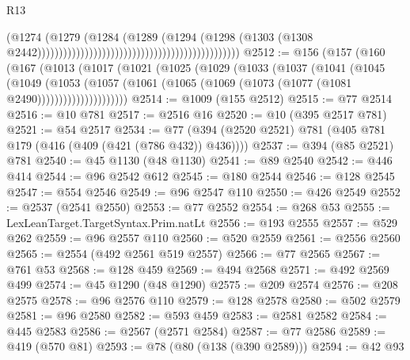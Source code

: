 \begin{lexlean}{R13}
\begin{coremodule}
                                                                                  (@1274
                                                                                    (@1279
                                                                                      (@1284
                                                                                        (@1289
                                                                                          (@1294
                                                                                            (@1298
                                                                                              (@1303
                                                                                                (@1308
                                                                                                  @2442)))))))))))))))))))))))))))))))))))))))))))))))
@2512 := @156
    (@157
      (@160
        (@167
          (@1013
            (@1017
              (@1021
                (@1025
                  (@1029
                    (@1033
                      (@1037
                        (@1041
                          (@1045
                            (@1049
                              (@1053
                                (@1057
                                  (@1061
                                    (@1065 (@1069 (@1073 (@1077 (@1081 @2490)))))))))))))))))))))
@2514 := @1009 (@155 @2512)
@2515 := @77 @2514
@2516 := @10 @781
@2517 := @2516 @16
@2520 := @10 (@395 @2517 @781)
@2521 := @54 @2517
@2534 := @77 (@394 (@2520 @2521) @781 (@405 @781 @179 (@416 (@409 (@421 (@786 @432)) @436))))
@2537 := @394 (@85 @2521) @781
@2540 := @45 @1130 (@48 @1130)
@2541 := @89 @2540
@2542 := @446 @414
@2544 := @96 @2542 @612
@2545 := @180 @2544
@2546 := @128 @2545
@2547 := @554 @2546
@2549 := @96 @2547 @110
@2550 := @426 @2549
@2552 := @2537 (@2541 @2550)
@2553 := @77 @2552
@2554 := @268 @53
@2555 := LexLeanTarget.TargetSyntax.Prim.natLt
@2556 := @193 @2555
@2557 := @529 @262
@2559 := @96 @2557 @110
@2560 := @520 @2559
@2561 := @2556 @2560
@2565 := @2554 (@492 @2561 @519 @2557)
@2566 := @77 @2565
@2567 := @761 @53
@2568 := @128 @459
@2569 := @494 @2568
@2571 := @492 @2569 @499
@2574 := @45 @1290 (@48 @1290)
@2575 := @209 @2574
@2576 := @208 @2575
@2578 := @96 @2576 @110
@2579 := @128 @2578
@2580 := @502 @2579
@2581 := @96 @2580
@2582 := @593 @459
@2583 := @2581 @2582
@2584 := @445 @2583
@2586 := @2567 (@2571 @2584)
@2587 := @77 @2586
@2589 := @419 (@570 @81)
@2593 := @78 (@80 (@138 (@390 @2589)))
@2594 := @42 @93

\end{coremodule}
\end{lexlean}
